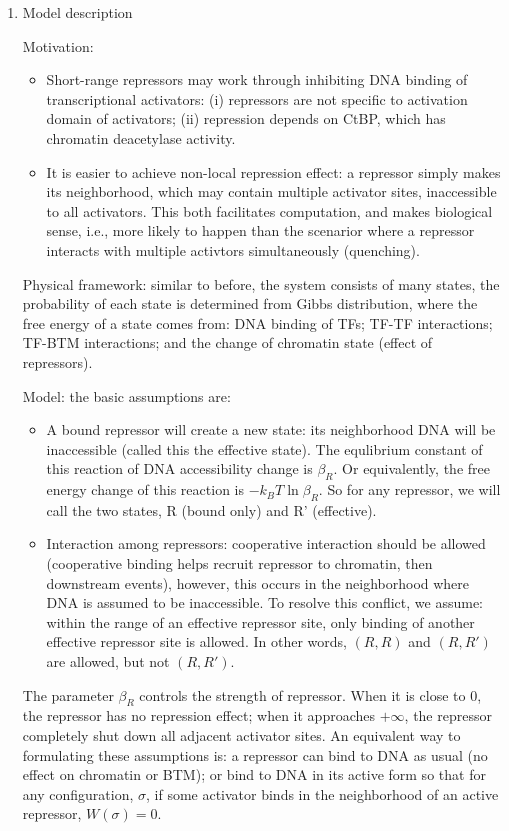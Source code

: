 \documentclass[11pt]{article}
\begin{document}
\begin{enumerate}
\begin{enumerate}
	
\item Model description

Motivation: 
\begin{itemize}
\item Short-range repressors may work through inhibiting DNA binding of transcriptional activators: (i) repressors are not specific to activation domain of activators; (ii) repression depends on CtBP, which has chromatin deacetylase activity. 
\item It is easier to achieve non-local repression effect: a repressor simply makes its neighborhood, which may contain multiple activator sites, inaccessible to all activators. This both facilitates computation, and makes biological sense, i.e., more likely to happen than the scenarior where a repressor interacts with multiple activtors simultaneously (quenching). 
\end{itemize}

Physical framework: similar to before, the system consists of many states, the probability of each state is determined from Gibbs distribution, where the free energy of a state comes from: DNA binding of TFs; TF-TF interactions; TF-BTM interactions; and the change of chromatin state (effect of repressors). 

Model: the basic assumptions are: 
\begin{itemize}
\item A bound repressor will create a new state: its neighborhood DNA will be inaccessible (called this the effective state). The equlibrium constant of this reaction of DNA accessibility change is $\beta_R$. Or equivalently, the free energy change of this reaction is $-k_B T \ln \beta_R$. So for any repressor, we will call the two states, R (bound only) and R' (effective). 
\item Interaction among repressors: cooperative interaction should be allowed (cooperative binding helps recruit repressor to chromatin, then downstream events), however, this occurs in the neighborhood where DNA is assumed to be inaccessible. To resolve this conflict, we assume: within the range of an effective repressor site, only binding of another effective repressor site is allowed. In other words, $(R,R)$ and $(R,R')$ are allowed, but not $(R,R')$. 
\end{itemize}
The parameter $\beta_R$ controls the strength of repressor. When it is close to 0, the repressor has no repression effect; when it approaches $+\infty$, the repressor completely shut down all adjacent activator sites. An equivalent way to formulating these assumptions is: a repressor can bind to DNA as usual (no effect on chromatin or BTM); or bind to DNA in its active form so that for any configuration, $\sigma$, if some activator binds in the neighborhood of an active repressor, $W(\sigma) = 0$. 


\end{enumerate}
\end{enumerate}
\end{document}
